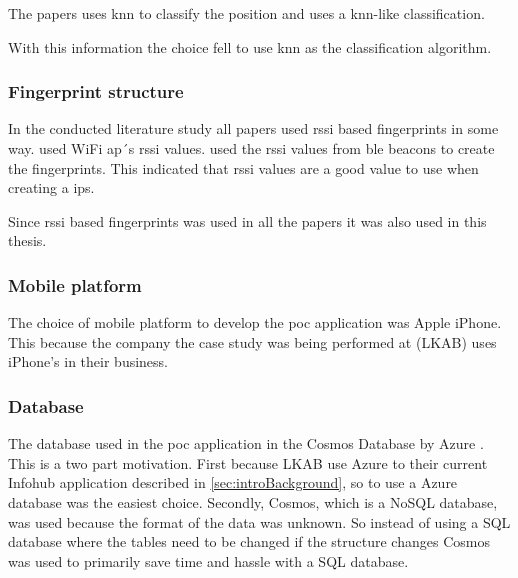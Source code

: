 \bigskip

The papers \cite{BluetoothLowEnergy2018, DevelopmentSmartphoneBasedUniversity2021} uses \acrshort{knn} to classify the position and \cite{PracticalFingerprintingLocalization2017} uses a \acrshort{knn}-like classification.

\bigskip

With this information the choice fell to use \acrshort{knn} as the classification algorithm.

\subsubsection{Fingerprint structure}\label{sec:methodSoftwareDesignFingerprint}
In the conducted literature study all papers used \acrfull{rssi} based fingerprints in some way.
\cite{DevelopmentSmartphoneBasedUniversity2021, IndoorPositioningSystem2010} used WiFi \acrfull{ap}´s \acrshort{rssi} values.
\cite{BluetoothLowEnergy2018, PracticalFingerprintingLocalization2017, ComprehensiveStudyBluetooth2013} used the \acrshort{rssi} values from \acrshort{ble} beacons to create the fingerprints.
This indicated that \acrshort{rssi} values are a good value to use when creating a \acrshort{ips}.
\bigskip

Since \acrshort{rssi} based fingerprints was used in all the papers it was also used in this thesis.


\subsubsection{Mobile platform}\label{sec:methodSoftwareDesignMobilePlatform}
The choice of mobile platform to develop the \acrlong{poc} application was Apple iPhone.
This because the company the case study was being performed at (LKAB) uses iPhone's in their business.

\subsubsection{Database}\label{sec:methodSoftwareDesignDatabase}
The database used in the \acrshort{poc} application in the Cosmos Database by Azure \cite{IntroductionAzureCosmos}.
This is a two part motivation.
First because LKAB use Azure to their current Infohub application described in \cref{sec:introBackground}, so to use a Azure database was the easiest choice.
Secondly, Cosmos, which is a NoSQL database, was used because the format of the data was unknown.
So instead of using a SQL database where the tables need to be changed if the structure changes Cosmos was used to primarily save time and hassle with a SQL database.


